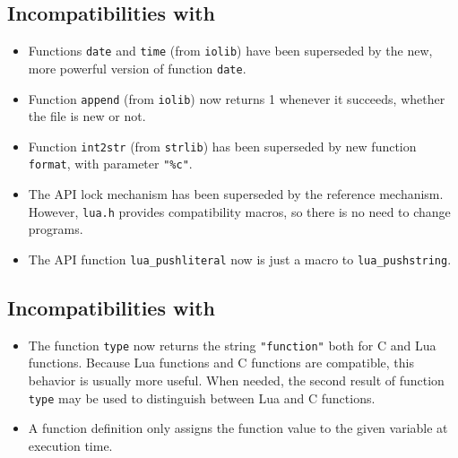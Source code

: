 \subsection*{Incompatibilities with }
\begin{itemize}
\item
Functions \verb'date' and \verb'time' (from \verb'iolib')
have been superseded by the new, more powerful version of function \verb'date'.
\item
Function \verb'append' (from \verb'iolib') now returns 1 whenever it succeeds,
whether the file is new or not.
\item
Function \verb'int2str' (from \verb'strlib') has been superseded by new
function \verb'format', with parameter \verb'"%c"'.
\item
The API lock mechanism has been superseded by the reference mechanism.
However, \verb-lua.h- provides compatibility macros,
so there is no need to change programs.
\item
The API function \verb'lua_pushliteral' now is just a macro to
\verb'lua_pushstring'.
\end{itemize}

\subsection*{Incompatibilities with }
\begin{itemize}
\item
The function \verb'type' now returns the string \verb'"function"'
both for C and Lua functions.
Because Lua functions and C functions are compatible,
this behavior is usually more useful.
When needed, the second result of function {\tt type} may be used
to distinguish between Lua and C functions.
\item
A function definition only assigns the function value to the
given variable at execution time.
\end{itemize}


